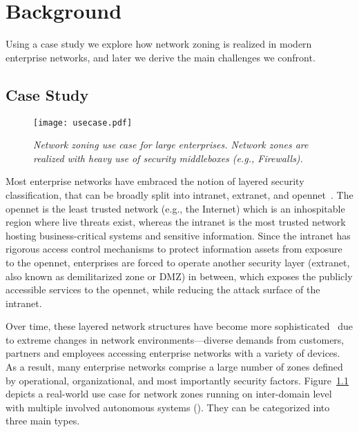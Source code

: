 \chapter{Background}
\label{background}

Using a case study we explore how network zoning is realized in modern enterprise networks, and later we derive the main challenges we confront.

\section{Case Study}
\label{sec:casestudy}

\begin{figure}[htb]
	\begin{center}
		\texttt{[image: usecase.pdf]}
	\end{center}
	\caption{\textit{Network zoning use case for large enterprises. Network zones are
			realized with heavy use of security middleboxes (e.g., Firewalls).}}
	\label{fig:usecase}
\end{figure}

Most enterprise networks have embraced the notion of layered security classification,
that can be broadly split into intranet, extranet, and opennet~\cite{ramasamy2011towards}.
The opennet is the least trusted network (e.g., the Internet) which is an inhospitable region
where live threats exist, whereas the intranet is the most trusted network hosting
business-critical systems and sensitive information. Since the intranet has rigorous access
control mechanisms to protect information assets from exposure to the opennet, enterprises are
forced to operate another security layer (extranet, also known as demilitarized zone or DMZ) in between,
which exposes the publicly accessible services to the opennet, while reducing the attack surface of the intranet.

Over time, these layered network structures have become more sophisticated~\cite{obregon2015infrastructure}
due to extreme changes in network environments---diverse demands from customers, partners
and employees accessing enterprise networks with a variety of devices.
As a result, many enterprise networks
comprise a large number of zones defined by operational, organizational, and most
importantly security factors. Figure~\ref{fig:usecase} depicts a real-world use case for
network zones running on inter-domain level with multiple involved autonomous systems (\ases). They
can be categorized into three main types.

